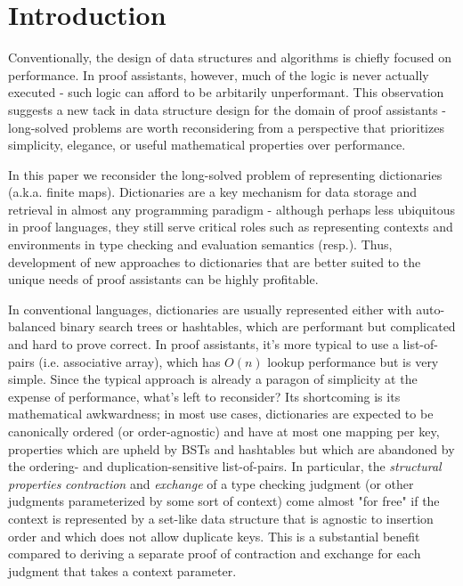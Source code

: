 \documentclass[nonacm]{acmart}
\theoremstyle{slplain}
\numberwithin{thm}{section}
\begin{document}
\section{Introduction}
Conventionally, the design of data structures and algorithms is chiefly focused on performance.
In proof assistants, however, much of the logic is never actually executed - such logic can afford
to be arbitarily unperformant. This observation suggests a new tack in data structure design for
the domain of proof assistants - long-solved problems are worth reconsidering from a perspective
that prioritizes simplicity, elegance, or useful mathematical properties over performance.

In this paper we reconsider the long-solved problem of representing dictionaries (a.k.a. finite maps).
Dictionaries are a key
mechanism for data storage and retrieval in almost any programming paradigm - although perhaps less
ubiquitous in proof languages, they still serve critical roles such as representing contexts and
environments in type checking and evaluation semantics (resp.). Thus, development of new approaches to
dictionaries that are better suited to the unique needs of proof assistants can be highly profitable.

In conventional languages,
dictionaries are usually represented either with auto-balanced binary search trees or hashtables, which
are performant but complicated and hard to prove correct. In proof assistants, it's more typical to
use a list-of-pairs (i.e. associative array), which has $O(n)$ lookup performance but is very simple.
Since the typical approach is already a paragon of simplicity at the expense of performance, what's left
to reconsider? Its shortcoming is its mathematical awkwardness; in most use cases, dictionaries are
expected to be canonically ordered (or order-agnostic) and have at most one mapping per key,
properties which are upheld by BSTs and hashtables
but which are abandoned by the ordering- and duplication-sensitive list-of-pairs. In particular,
the \emph{structural properties} \emph{contraction} and \emph{exchange} of a type checking judgment (or
other judgments parameterized by some sort of context) come almost "for free" if the context is represented by
a set-like data structure that is agnostic to insertion order and which does not allow duplicate keys.
This is a substantial benefit compared to deriving a separate proof of contraction and exchange for each
judgment that takes a context parameter.
\end{document}
